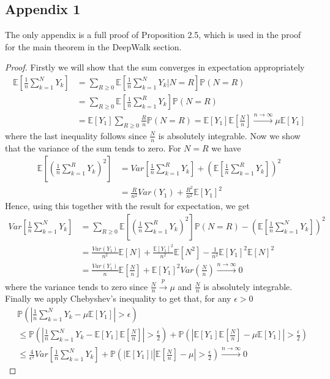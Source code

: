 \documentclass[a4paper]{article}
\renewcommand{\P}{\mathbb P}
\renewcommand{\E}{\mathbb E}
\begin{document}
\subsection{Appendix 1}
The only appendix is a full proof of Proposition 2.5, which is used in the proof for the main theorem in the DeepWalk section.
\Prop*
\begin{proof}
Firstly we will show that the sum converges in expectation appropriately
\begin{align*}
\E\left[\frac{1}{n}\sum_{k=1}^N Y_k\right] &= \sum_{R \geq 0} \E\left[\frac{1}{n}\sum_{k=1}^N Y_k | N = R\right]\P(N = R)\\
&= \sum_{R \geq 0} \E\left[\frac{1}{n}\sum_{k=1}^R Y_k \right]\P(N = R)\\
&= \E[Y_1]\sum_{R \geq 0} \frac{R}{n}\P(N = R) = \E[Y_1]\E\left[\frac{N}{n}\right] \overset{n \to \infty}{\longrightarrow} \mu\E[Y_1]
\end{align*}
where the last inequality follows since $\frac{N}{n}$ is absolutely integrable. Now we show that the variance of the sum tends to zero. For $N = R$ we have
\begin{align*}
\E\left[\left(\frac{1}{n}\sum_{k=1}^R Y_k\right)^2\right] &= Var\left[\frac{1}{n}\sum_{k=1}^R Y_k\right] + \left(\E\left[\frac{1}{n}\sum_{k=1}^R Y_k\right]\right)^2\\
&=\frac{R}{n^2}Var(Y_1) + \frac{R^2}{n^2}\E[Y_1]^2
\end{align*}
Hence, using this together with the result for expectation, we get
\begin{align*}
  Var\left[\frac{1}{n}\sum_{k=1}^N Y_k\right] &= \sum_{R \geq 0}\E\left[\left(\frac{1}{n}\sum_{k=1}^R Y_k\right)^2 \right]\P(N = R) - \left(\E\left[\frac{1}{n}\sum_{k=1}^N Y_k\right]\right)^2\\
  &=\frac{Var(Y_1)}{n^2}\E[N] + \frac{\E[Y_1]^2}{n^2}\E[N^2] - \frac{1}{n^2}\E[Y_1]^2\E[N]^2\\
  &= \frac{Var(Y_1)}{n}\E\left[\frac{N}{n}\right] + \E[Y_1]^2Var\left(\frac{N}{n}\right) \overset{n \to \infty}{\longrightarrow} 0
\end{align*}
where the variance tends to zero since $\frac{N}{n} \overset{p}{\longrightarrow} \mu$ and $\frac{N}{n}$ is absolutely integrable. Finally we apply Chebyshev's inequality to get that, for any $\epsilon > 0$
\begin{align*}
&\P\left(\left|\frac{1}{n}\sum_{k=1}^N Y_k - \mu\E[Y_1]\right| > \epsilon\right)\\
&\leq \P\left(\left|\frac{1}{n}\sum_{k=1}^N Y_k - \E[Y_1]\E\left[\frac{N}{n}\right]\right| > \frac{\epsilon}{2}\right) + \P\left(\left|\E[Y_1]\E\left[\frac{N}{n}\right] - \mu\E[Y_1]\right| > \frac{\epsilon}{2}\right)\\
&\leq \frac{4}{\epsilon^2}Var\left[\frac{1}{n}\sum_{k=1}^N Y_k\right] + \P\left(|\E[Y_1]|\left|\E\left[\frac{N}{n}\right] - \mu\right| > \frac{\epsilon}{2}\right) \overset{n \to \infty}{\longrightarrow} 0
\end{align*}
\end{proof}






\printindex
\end{document}
